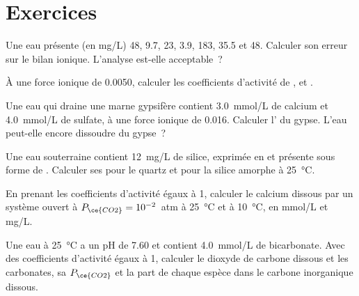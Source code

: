 \section{Exercices}

\begin{exercise}[$\star$]\label{exo:b3:water-rock-interaction:1}
Une eau présente (en \unit{mg/L})  48,  9.7,  23,  3.9,
 183,  35.5 et  48. Calculer son erreur sur le
bilan ionique. L'analyse est-elle acceptable~?
\end{exercise}

\begin{exercise}[$\star$]\label{exo:b3:water-rock-interaction:2}
À une force ionique de 0.0050, calculer les coefficients d'activité de
,  et .
\end{exercise}

\begin{exercise}[$\star$]\label{exo:b3:water-rock-interaction:3}
Une eau qui draine une marne gypsifère contient \qty{3.0}{mmol/L} de calcium et
\qty{4.0}{mmol/L} de sulfate, à une force ionique de 0.016. Calculer l' du gypse. L'eau peut-elle encore dissoudre du gypse~?
\end{exercise}

\begin{exercise}[$\star$]\label{exo:b3:water-rock-interaction:4}
Une eau souterraine contient \qty{12}{mg/L} de silice, exprimée en  et
présente sous forme de . Calculer ses  pour le quartz et pour
la silice amorphe à \qty{25}{\celsius}.
\end{exercise}

\begin{exercise}[$\star\star$]\label{exo:b3:water-rock-interaction:5}
En prenant les coefficients d'activité égaux à 1, calculer le calcium dissous par un
système ouvert à $P_{\ce{CO2}} = 10^{-2}$~atm à \qty{25}{\celsius} et à
\qty{10}{\celsius}, en \unit{mmol/L} et \unit{mg/L}.
\end{exercise}

\begin{exercise}[$\star\star$]\label{exo:b3:water-rock-interaction:6}
Une eau à \qty{25}{\celsius} a un pH de 7.60 et contient \qty{4.0}{mmol/L} de
bicarbonate. Avec des coefficients d'activité égaux à 1, calculer le
dioxyde de carbone dissous et les carbonates, sa $P_{\ce{CO2}}$ et la part de chaque espèce dans
le carbone inorganique dissous.
\end{exercise}

